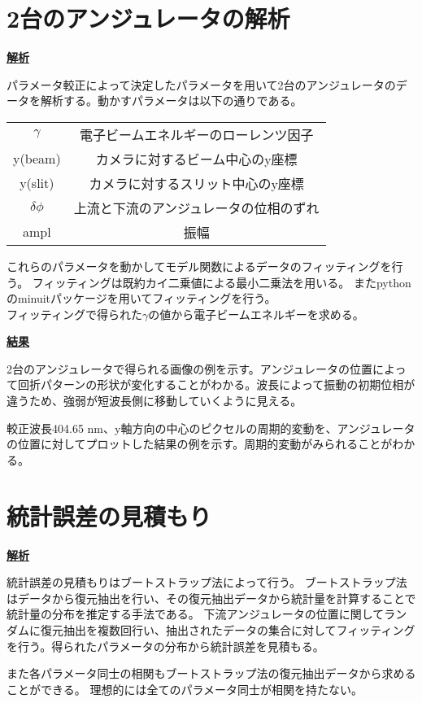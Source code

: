 \documentclass[a4paper,11pt,uplatex]{jsbook}
\begin{document}
\section{2台のアンジュレータの解析}
\noindent \textbf{\underline{解析}}\par
パラメータ較正によって決定したパラメータを用いて2台のアンジュレータのデータを解析する。動かすパラメータは以下の通りである。
\begin{table}[h]
\centering
\begin{tabular}{cc}
  $\gamma$ & 電子ビームエネルギーのローレンツ因子 \\
  y(beam) & カメラに対するビーム中心のy座標 \\
  y(slit) & カメラに対するスリット中心のy座標 \\
  $\delta \phi$ & 上流と下流のアンジュレータの位相のずれ\\
  ampl & 振幅
\end{tabular}
\end{table}
これらのパラメータを動かしてモデル関数によるデータのフィッティングを行う。
フィッティングは既約カイ二乗値による最小二乗法を用いる。
またpythonのminuitパッケージを用いてフィッティングを行う。\\
フィッティングで得られた$\gamma$の値から電子ビームエネルギーを求める。

\noindent \textbf{\underline{結果}}\par
2台のアンジュレータで得られる画像の例を示す。アンジュレータの位置によって回折パターンの形状が変化することがわかる。波長によって振動の初期位相が違うため、強弱が短波長側に移動していくように見える。

較正波長404.65 nm、y軸方向の中心のピクセルの周期的変動を、アンジュレータの位置に対してプロットした結果の例を示す。周期的変動がみられることがわかる。

\section{統計誤差の見積もり}
\noindent \textbf{\underline{解析}}\par
統計誤差の見積もりはブートストラップ法によって行う。
ブートストラップ法はデータから復元抽出を行い、その復元抽出データから統計量を計算することで統計量の分布を推定する手法である。
下流アンジュレータの位置に関してランダムに復元抽出を複数回行い、抽出されたデータの集合に対してフィッティングを行う。得られたパラメータの分布から統計誤差を見積もる。

また各パラメータ同士の相関もブートストラップ法の復元抽出データから求めることができる。
理想的には全てのパラメータ同士が相関を持たない。
\end{document}
